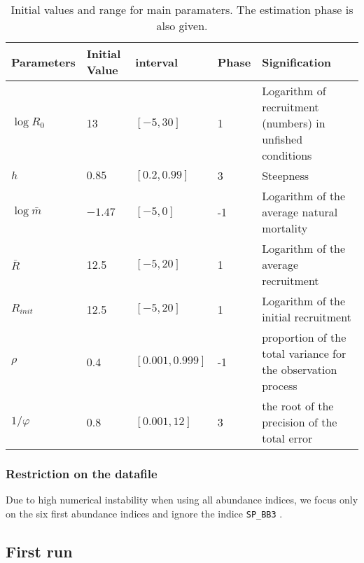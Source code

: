 \begin{table}[ht]
\centering
\begin{tabular}{p{2.1cm}p{2.1cm}p{2.2cm}p{2cm}p{6cm}}
  \hline
Parameters & Initial Value & interval & Phase & Signification  \\ \hline
 $\log{R_0}$ & 13  & $[-5,30]$ & 1 & Logarithm of recruitment (numbers) in unfished conditions\\
 $h$ & $0.85$ & $[0.2, 0.99]$ & 3 &  Steepness \\
$\log{\bar{m}}$ & $-1.47$ & $[-5,0]$ &-1 & Logarithm of the average natural mortality\\
$\bar{R}$& 12.5	& $[-5,	20]$ &	1	 & Logarithm of the average recruitment\\
$R_{init}$ & 12.5&	$[-5,	20]$ &	1	 & Logarithm of the initial recruitment\\
$\rho$ & 0.4	& $[0.001,0.999]$ & -1 & proportion of the total variance for the observation process \\
$1/\varphi$ & 0.8 &	$[0.001,	12]$ & 	3 & the root of the precision of the total error \\
\hline
\end{tabular}
\caption{Initial values and range for main paramaters. The estimation phase is also given.}
\label{table:initial}
\end{table}



\subsubsection{Restriction on the datafile}
Due to high numerical instability when using all abundance indices, we focus only on the six first abundance indices and ignore the indice \verb+SP_BB3+ .



\subsection{First run}









